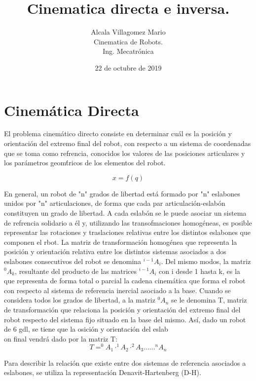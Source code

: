 \documentclass[letter,openright,12pt,spanish]{report}
\title{\textbf{Cinematica directa e inversa.}}
\author{Alcala Villagomez Mario\\
		Cinematica de Robots.\\
		Ing. Mecatr\'onica}
\date{22 de octubre de 2019}
\begin{document}
\maketitle

\section{Cinem\'atica Directa}

El problema cinem\'atico directo consiste en determinar cu\'al es la posici\'on y orientaci\'on del extremo final del robot, con respecto a un sistema de coordenadas que se toma como refrencia, conocidos los valores de las posiciones articulares y los par\'ametros geom\'tricos de los elementos del robot. 

\begin{displaymath}
x=\textit{f}(q)
\end{displaymath}

En general, un robot de "n" grados de libertad est\'a formado por "n" eslabones unidos por "n" articulaciones, de forma que cada par articulaci\'on-eslab\'on constituyen un grado de libertad. A cada eslab\'on se le puede asociar un sistema de refrencia solidario a \'el y, utilizando las transofmaciones homog\'eneas, es posible representar las rotaciones y traslaciones relativas entre los distintos eslabones que componen el rbot. La matriz de transformaci\'on homog\'enea que representa la posici\'on y orientaci\'on relativa entre los distintos sistemas asociados a dos eslabones consecutivos del robot se denomina $^{i-1}A_i$. Del mismo modos, la matriz $^0A_k$, resultante del producto de las matrices $^{i-1}A_i$ con i desde 1 hasta k, es la que representa de forma total o parcial la cadena cinem\'atica que forma el robot con respecto al sistema de referencia inercial asociado a la base. Cuando se considera todos los grados de libertad, a la matriz $^0A_n$ se le denomina T, matriz de transformaci\'on que relaciona la posici\'on y orientaci\'on del extremo final del robot respecto del sistema fijo situado en la base del mismo. As\'i, dado un robot de 6 gdl, se tiene que la osici\'on y orientaci\'on del eslab\\on final vendr\'a dado por la matriz T:\\

\begin{displaymath}
T=^0A_1 \cdot ^1A_2 \cdot ^2A_3... ... ^nA_n
\end{displaymath} 

Para describir la relaci\'on que existe entre dos sistemas de referencia asociados a eslabones, se utiliza la representaci\'on Denavit-Hartenberg (D-H). 
\end{document}
